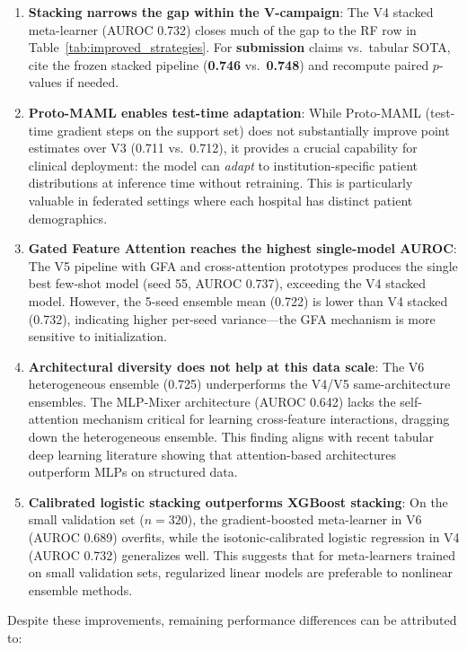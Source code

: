 \begin{enumerate}
\item \textbf{Stacking narrows the gap within the V-campaign}: The V4 stacked meta-learner (AUROC 0.732) closes much of the gap to the RF row in Table~\ref{tab:improved_strategies}. For \textbf{submission} claims vs.\ tabular SOTA, cite the frozen stacked pipeline (\textbf{0.746} vs.\ \textbf{0.748}) and recompute paired $p$-values if needed.

\item \textbf{Proto-MAML enables test-time adaptation}: While Proto-MAML (test-time gradient steps on the support set) does not substantially improve point estimates over V3 (0.711 vs.\ 0.712), it provides a crucial capability for clinical deployment: the model can \emph{adapt} to institution-specific patient distributions at inference time without retraining. This is particularly valuable in federated settings where each hospital has distinct patient demographics.

\item \textbf{Gated Feature Attention reaches the highest single-model AUROC}: The V5 pipeline with GFA and cross-attention prototypes produces the single best few-shot model (seed 55, AUROC 0.737), exceeding the V4 stacked model. However, the 5-seed ensemble mean (0.722) is lower than V4 stacked (0.732), indicating higher per-seed variance---the GFA mechanism is more sensitive to initialization.

\item \textbf{Architectural diversity does not help at this data scale}: The V6 heterogeneous ensemble (0.725) underperforms the V4/V5 same-architecture ensembles. The MLP-Mixer architecture (AUROC 0.642) lacks the self-attention mechanism critical for learning cross-feature interactions, dragging down the heterogeneous ensemble. This finding aligns with recent tabular deep learning literature showing that attention-based architectures outperform MLPs on structured data.

\item \textbf{Calibrated logistic stacking outperforms XGBoost stacking}: On the small validation set ($n=320$), the gradient-boosted meta-learner in V6 (AUROC 0.689) overfits, while the isotonic-calibrated logistic regression in V4 (AUROC 0.732) generalizes well. This suggests that for meta-learners trained on small validation sets, regularized linear models are preferable to nonlinear ensemble methods.
\end{enumerate}

Despite these improvements, remaining performance differences can be attributed to:

